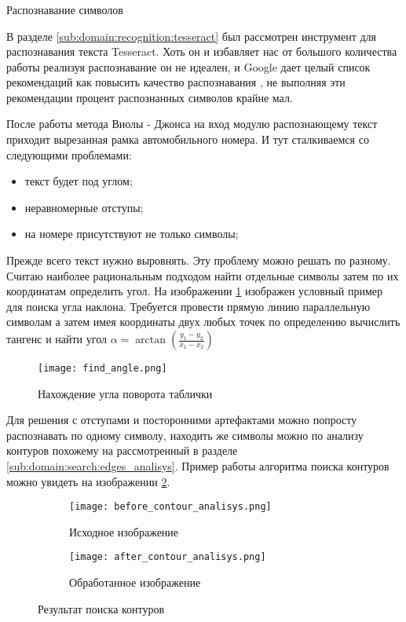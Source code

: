 \subsubsection{}
Распознавание символов

В разделе \ref{sub:domain:recognition:tesseract} был рассмотрен инструмент для распознавания текста Tesseract. Хоть он и избавляет нас от большого количества работы реализуя распознавание он не идеален, и Google дает целый список рекомендаций как повысить качество распознавания \cite{tesseract_impruvment}, не выполняя эти рекомендации процент распознанных символов крайне мал.

После работы метода Виолы - Джонса на вход модулю распознающему текст приходит вырезанная рамка автомобильного номера. И тут сталкиваемся со следующими проблемами:
\begin{itemize}
	\item текст будет под углом;
	\item неравномерные отступы;
	\item на номере присутствуют не только символы;
\end{itemize}

Прежде всего текст нужно выровнять. Эту проблему можно решать по разному. Считаю наиболее рациональным подходом найти отдельные символы затем по их координатам определить угол. На изображении \ref{fig:funcreq:analisys} изображен условный пример для поиска угла наклона. Требуется провести прямую линию параллельную символам а затем имея координаты двух любых точек по определению вычислить тангенс и найти угол $\alpha = \arctan(\frac{y_1 - y_2}{x_1 - x_2})$

\begin{figure}[ht]
\centering
    \texttt{[image: find\_angle.png]}  
    \caption{Нахождение угла поворота таблички}
    \label{fig:funcreq:analisys}
\end{figure}

Для решения с отступами и посторонними артефактами можно попросту распознавать по одному символу, находить же символы можно по анализу контуров похожему на рассмотренный в разделе \ref{sub:domain:search:edges_analisys}. Пример работы алгоритма поиска контуров можно увидеть на изображении \ref{fig:funcreq:analisys:contour}.

\begin{figure}[ht]
\centering
  \begin{subfigure}[b]{0.48\textwidth} 
    \centering
    \texttt{[image: before\_contour\_analisys.png]}  
    \caption{Исходное изображение}
  \end{subfigure}
  \begin{subfigure}[b]{0.48\textwidth} 
    \centering
    \texttt{[image: after\_contour\_analisys.png]}  
    \caption{Обработанное изображение}
  \end{subfigure}
  \caption{Результат поиска контуров}
  \label{fig:funcreq:analisys:contour}
\end{figure}

